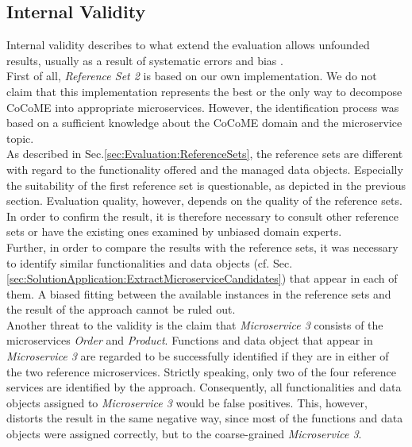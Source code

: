 \subsection{Internal Validity}
Internal validity describes to what extend the evaluation allows unfounded results, usually as a result of systematic errors and bias \cite{Validity}. \\
First of all, \textit{Reference Set 2} is based on our own implementation. We do not claim that this implementation represents the best or the only way to decompose CoCoME into appropriate microservices. However, the identification process was based on a sufficient knowledge about the CoCoME domain and the microservice topic. \\
As described in Sec.\ref{sec:Evaluation:ReferenceSets}, the reference sets are different with regard to the functionality offered and the managed data objects. Especially the suitability of the first reference set is questionable, as depicted in the previous section. Evaluation quality, however, depends on the quality of the reference sets. In order to confirm the result, it is therefore necessary to consult other reference sets or have the existing ones examined by unbiased domain experts.\\
Further, in order to compare the results with the reference sets, it was necessary to identify similar functionalities and data objects (cf. Sec.\ref{sec:SolutionApplication:ExtractMicroserviceCandidates}) that appear in each of them. A biased fitting between the available instances in the reference sets and the result of the approach cannot be ruled out.\\
Another threat to the validity is the claim that \textit{Microservice 3} consists of the microservices \textit{Order} and \textit{Product}. Functions and data object that appear in \textit{Microservice 3} are regarded to be successfully identified if they are in either of the two reference microservices. Strictly speaking, only two of the four reference services are identified by the approach. Consequently, all functionalities and data objects assigned to \textit{Microservice 3} would be false positives. This, however, distorts the result in the same negative way, since most of the functions and data objects were assigned correctly, but to the coarse-grained \textit{Microservice 3}.




